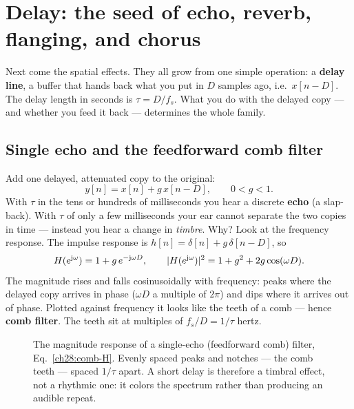 \section{Delay: the seed of echo, reverb, flanging, and chorus}
\label{ch28:delay}

Next come the spatial effects. They all grow from one simple operation: a
\textbf{delay line}, a buffer that hands back what you put in $D$ samples ago,
i.e.\ $x[n-D]$. The delay length in seconds is $\tau=D/f_s$. What you do with the
delayed copy --- and whether you feed it back --- determines the whole family.

\subsection{Single echo and the feedforward comb filter}

Add one delayed, attenuated copy to the original:
\begin{equation}
\label{ch28:feedforward-comb}
y[n]=x[n]+g\,x[n-D],\qquad 0<g<1.
\end{equation}
With $\tau$ in the tens or hundreds of milliseconds you hear a discrete
\textbf{echo} (a slap-back). With $\tau$ of only a few milliseconds your ear
cannot separate the two copies in time --- instead you hear a change in
\emph{timbre}. Why? Look at the frequency response. The impulse response is
$h[n]=\delta[n]+g\,\delta[n-D]$, so
\begin{equation}
\label{ch28:comb-H}
H(e^{\mathrm{j}\omega})=1+g\,e^{-\mathrm{j}\omega D},
\qquad
\lvert H(e^{\mathrm{j}\omega})\rvert^2 = 1+g^2+2g\cos(\omega D).
\end{equation}
The magnitude rises and falls cosinusoidally with frequency: peaks where the
delayed copy arrives in phase ($\omega D$ a multiple of $2\pi$) and dips where it
arrives out of phase. Plotted against frequency it looks like the teeth of a
comb --- hence \textbf{comb filter}. The teeth sit at multiples of $f_s/D=1/\tau$
hertz.

\begin{figure}[H]
\centering
{}
\caption{The magnitude response of a single-echo (feedforward comb) filter,
Eq.~\eqref{ch28:comb-H}. Evenly spaced peaks and notches --- the comb teeth ---
spaced $1/\tau$ apart. A short delay is therefore a timbral effect, not a rhythmic
one: it colors the spectrum rather than producing an audible repeat.}
\label{ch28:fig-comb}
\end{figure}

